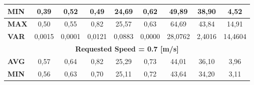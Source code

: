 \begin{landscape}
\begin{table}[H]
{\begin{tabular}{lcccccccc}
\multicolumn{1}{|l|}{\textbf{MIN}} &
  \multicolumn{1}{c|}{{\color[HTML]{595959} 0,39}} &
  \multicolumn{1}{c|}{{\color[HTML]{595959} 0,52}} &
  \multicolumn{1}{c|}{{\color[HTML]{595959} 0,49}} &
  \multicolumn{1}{c|}{{\color[HTML]{595959} 24,69}} &
  \multicolumn{1}{c|}{{\color[HTML]{595959} 0,62}} &
  \multicolumn{1}{c|}{{\color[HTML]{595959} 49,89}} &
  \multicolumn{1}{c|}{{\color[HTML]{595959} 38,90}} &
  \multicolumn{1}{c|}{{\color[HTML]{595959} 4,52}} \\ \hline
\multicolumn{1}{|l|}{\textbf{MAX}} &
  \multicolumn{1}{c|}{{\color[HTML]{595959} 0,50}} &
  \multicolumn{1}{c|}{{\color[HTML]{595959} 0,55}} &
  \multicolumn{1}{c|}{{\color[HTML]{595959} 0,82}} &
  \multicolumn{1}{c|}{{\color[HTML]{595959} 25,57}} &
  \multicolumn{1}{c|}{{\color[HTML]{595959} 0,63}} &
  \multicolumn{1}{c|}{{\color[HTML]{595959} 64,69}} &
  \multicolumn{1}{c|}{{\color[HTML]{595959} 43,84}} &
  \multicolumn{1}{c|}{{\color[HTML]{595959} 14,91}} \\ \hline
\multicolumn{1}{|l|}{\textbf{VAR}} &
  \multicolumn{1}{c|}{{\color[HTML]{595959} 0,0015}} &
  \multicolumn{1}{c|}{{\color[HTML]{595959} 0,0001}} &
  \multicolumn{1}{c|}{{\color[HTML]{595959} 0,0121}} &
  \multicolumn{1}{c|}{{\color[HTML]{595959} 0,0883}} &
  \multicolumn{1}{c|}{{\color[HTML]{595959} 0,0000}} &
  \multicolumn{1}{c|}{{\color[HTML]{595959} 28,0762}} &
  \multicolumn{1}{c|}{{\color[HTML]{595959} 2,4016}} &
  \multicolumn{1}{c|}{{\color[HTML]{595959} 14,4604}} \\ \hline
\multicolumn{9}{|c|}{\textbf{Requested Speed = 0.7 {[}m/s{]}}} \\ \hline
\multicolumn{1}{|l|}{\textbf{AVG}} &
  \multicolumn{1}{c|}{{\color[HTML]{595959} 0,57}} &
  \multicolumn{1}{c|}{{\color[HTML]{595959} 0,64}} &
  \multicolumn{1}{c|}{{\color[HTML]{595959} 0,82}} &
  \multicolumn{1}{c|}{{\color[HTML]{595959} 25,29}} &
  \multicolumn{1}{c|}{{\color[HTML]{595959} 0,73}} &
  \multicolumn{1}{c|}{{\color[HTML]{595959} 44,01}} &
  \multicolumn{1}{c|}{{\color[HTML]{595959} 36,10}} &
  \multicolumn{1}{c|}{{\color[HTML]{595959} 3,96}} \\ \hline
\multicolumn{1}{|l|}{\textbf{MIN}} &
  \multicolumn{1}{c|}{{\color[HTML]{595959} 0,56}} &
  \multicolumn{1}{c|}{{\color[HTML]{595959} 0,63}} &
  \multicolumn{1}{c|}{{\color[HTML]{595959} 0,70}} &
  \multicolumn{1}{c|}{{\color[HTML]{595959} 25,11}} &
  \multicolumn{1}{c|}{{\color[HTML]{595959} 0,72}} &
  \multicolumn{1}{c|}{{\color[HTML]{595959} 43,64}} &
  \multicolumn{1}{c|}{{\color[HTML]{595959} 34,20}} &
  \multicolumn{1}{c|}{{\color[HTML]{595959} 3,11}} \\ \hline

\end{tabular}}
\end{table}
\end{landscape}

